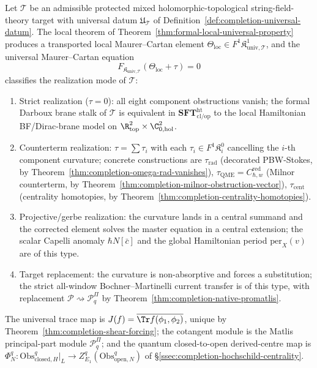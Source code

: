 \begin{thm}
\label{thm:completion-universal-formal-brane}
Let \(\mathcal T\) be an admissible protected mixed holomorphic-topological
string-field-theory target with universal datum \(\mathfrak U_{\mathcal T}\)
of Definition~\ref{def:completion-universal-datum}.  The local
theorem of Theorem~\ref{thm:formal-local-universal-property}
produces a transported local Maurer--Cartan element
\(\Theta_{\mathrm{loc}}\in F^1\mathfrak K^1_{\mathrm{univ},\mathcal T}\),
and the universal Maurer--Cartan equation
\[
  F_{\mathfrak K_{\mathrm{univ},\mathcal T}}(\Theta_{\mathrm{loc}}+\tau)=0
\]
classifies the realization mode of \(\mathcal T\):
\begin{enumerate}
\item Strict realization (\(\tau=0\)): all eight component
  obstructions vanish; the formal Darboux brane stalk of
  \(\mathcal T\) is equivalent in
  \(\mathbf{SFT}^{\mathrm{ht}}_{\mathrm{cl/op}}\) to the local
  Hamiltonian BF/Dirac-brane model on \(\R^2_{\mathrm{top}}\times
  \C^2_{0,\mathrm{hol}}\).
\item Counterterm realization: \(\tau=\sum\tau_i\) with each
  \(\tau_i\in F^1\mathfrak K^0_i\) cancelling the \(i\)-th component
  curvature; concrete constructions are
  \(\tau_{\mathrm{rad}}\) (decorated PBW-Stokes, by
  Theorem~\ref{thm:completion-omega-rad-vanishes}),
  \(\tau_{\mathrm{QME}}=C^{\mathrm{red}}_{\hbar,w}\) (Milnor
  counterterm, by
  Theorem~\ref{thm:completion-milnor-obstruction-vector}),
  \(\tau_{\mathrm{cent}}\) (centrality homotopies, by
  Theorem~\ref{thm:completion-centrality-homotopies}).
\item Projective/gerbe realization: the curvature lands in a
  central summand and the corrected element solves the master
  equation in a central extension; the scalar Capelli anomaly
  \(\hbar N[\bar c]\) and the global Hamiltonian period
  \(\mathrm{per}_X(v)\) are of this type.
\item Target replacement: the curvature is non-absorptive and
  forces a substitution; the strict all-window
  Bochner--Martinelli current transfer is of this type, with
  replacement \(\mathcal P\rightsquigarrow\mathcal P^\Pi_q\) by
  Theorem~\ref{thm:completion-native-promatlis}.
\end{enumerate}
The universal trace map is
\(J(f)=\overline{\Tr f(\phi_1,\phi_2)}\), unique by
Theorem~\ref{thm:completion-shear-forcing}; the cotangent module is
the Matlis principal-part module
\(\mathcal P^\Pi_q\); and the quantum closed-to-open derived-centre
map is
\(\Phi^q_N:\mathrm{Obs}^q_{\mathrm{closed},H}|_L\to
Z^q_{E_1}(\mathrm{Obs}^q_{\mathrm{open},N})\) of
\S\ref{ssec:completion-hochschild-centrality}.
\end{thm}

